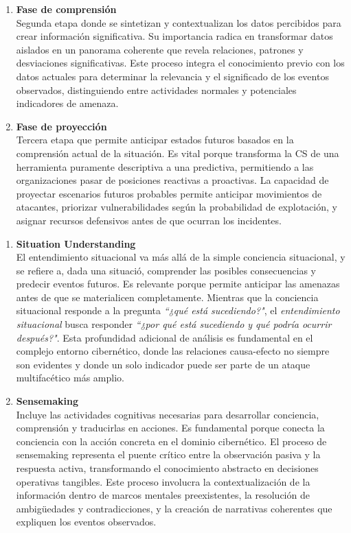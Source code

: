 \begin{enumerate}
\begin{enumerate}
   \item \textbf{Fase de comprensión} \\
   Segunda etapa donde se sintetizan y contextualizan los datos percibidos para crear información significativa. Su importancia radica en transformar datos aislados en un panorama coherente que revela relaciones, patrones y desviaciones significativas. Este proceso integra el conocimiento previo con los datos actuales para determinar la relevancia y el significado de los eventos observados, distinguiendo entre actividades normales y potenciales indicadores de amenaza.
   
   \item \textbf{Fase de proyección} \\
   Tercera etapa que permite anticipar estados futuros basados en la comprensión actual de la situación. Es vital porque transforma la CS de una herramienta puramente descriptiva a una predictiva, permitiendo a las organizaciones pasar de posiciones reactivas a proactivas. La capacidad de proyectar escenarios futuros probables permite anticipar movimientos de atacantes, priorizar vulnerabilidades según la probabilidad de explotación, y asignar recursos defensivos antes de que ocurran los incidentes.
\end{enumerate}
\end{enumerate}

\begin{enumerate}[resume]

\item \textbf{Situation Understanding} \\
El entendimiento situacional va más allá de la simple conciencia situacional, y se refiere a, dada una situació, comprender las posibles consecuencias y predecir eventos futuros. Es relevante porque permite anticipar las amenazas antes de que se materialicen completamente. Mientras que la conciencia situacional responde a la pregunta \textit{``¿qué está sucediendo?"}, el \textit{entendimiento situacional} busca responder \textit{``¿por qué está sucediendo y qué podría ocurrir después?"}. Esta profundidad adicional de análisis es fundamental en el complejo entorno cibernético, donde las relaciones causa-efecto no siempre son evidentes y donde un solo indicador puede ser parte de un ataque multifacético más amplio.

\item \textbf{Sensemaking} \\
Incluye las actividades cognitivas necesarias para desarrollar conciencia, comprensión y traducirlas en acciones. Es fundamental porque conecta la conciencia con la acción concreta en el dominio cibernético. El proceso de sensemaking representa el puente crítico entre la observación pasiva y la respuesta activa, transformando el conocimiento abstracto en decisiones operativas tangibles. Este proceso involucra la contextualización de la información dentro de marcos mentales preexistentes, la resolución de ambigüedades y contradicciones, y la creación de narrativas coherentes que expliquen los eventos observados.
\end{enumerate}

